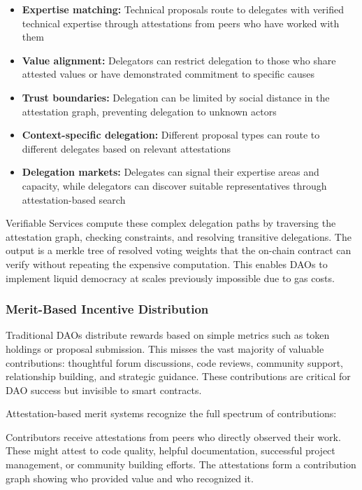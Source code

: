 \begin{itemize}
\item \textbf{Expertise matching:} Technical proposals route to delegates with verified technical expertise through attestations from peers who have worked with them
\item \textbf{Value alignment:} Delegators can restrict delegation to those who share attested values or have demonstrated commitment to specific causes
\item \textbf{Trust boundaries:} Delegation can be limited by social distance in the attestation graph, preventing delegation to unknown actors
\item \textbf{Context-specific delegation:} Different proposal types can route to different delegates based on relevant attestations
\item \textbf{Delegation markets:} Delegates can signal their expertise areas and capacity, while delegators can discover suitable representatives through attestation-based search
\end{itemize}

Verifiable Services compute these complex delegation paths by traversing the attestation graph, checking constraints, and resolving transitive delegations. The output is a merkle tree of resolved voting weights that the on-chain contract can verify without repeating the expensive computation. This enables DAOs to implement liquid democracy at scales previously impossible due to gas costs.

\subsubsection{Merit-Based Incentive Distribution}

Traditional DAOs distribute rewards based on simple metrics such as token holdings or proposal submission. This misses the vast majority of valuable contributions: thoughtful forum discussions, code reviews, community support, relationship building, and strategic guidance. These contributions are critical for DAO success but invisible to smart contracts.

Attestation-based merit systems recognize the full spectrum of contributions:

Contributors receive attestations from peers who directly observed their work. These might attest to code quality, helpful documentation, successful project management, or community building efforts. The attestations form a contribution graph showing who provided value and who recognized it.

